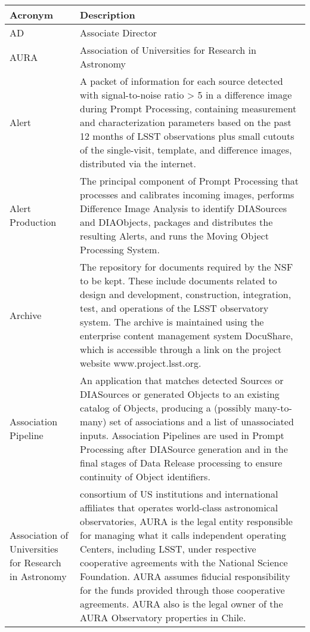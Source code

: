 \addtocounter{table}{-1}
\begin{longtable}{|l|p{}|}\hline
\textbf{Acronym} & \textbf{Description}  \\\hline

AD & Associate \gls{Director} \\\hline
AURA & \gls{Association of Universities for Research in Astronomy} \\\hline
Alert & A packet of information for each source detected with signal-to-noise ratio > 5 in a difference image during \gls{Prompt Processing}, containing measurement and characterization parameters based on the past 12 months of \gls{LSST} observations plus small cutouts of the single-visit, template, and difference images, distributed via the internet. \\\hline
Alert Production & The principal component of \gls{Prompt Processing} that processes and calibrates incoming images, performs \gls{Difference Image Analysis} to identify DIASources and DIAObjects, packages and distributes the resulting Alerts, and runs the \gls{Moving Object Processing System}. \\\hline
Archive & The repository for documents required by the \gls{NSF} to be kept. These include documents related to design and development, construction, integration, test, and operations of the \gls{LSST} observatory system. The archive is maintained using the enterprise content management system \gls{DocuShare}, which is accessible through a link on the project website www.project.lsst.org. \\\hline
Association Pipeline & An application that matches detected Sources or DIASources or generated Objects to an existing catalog of Objects, producing a (possibly many-to-many) set of associations and a list of unassociated inputs. Association Pipelines are used in \gls{Prompt Processing} after \gls{DIASource} generation and in the final stages of \gls{Data Release} processing to ensure continuity of \gls{Object} identifiers. \\\hline
Association of Universities for Research in Astronomy &  consortium of \gls{US} institutions and international affiliates that operates world-class astronomical observatories, \gls{AURA} is the legal entity responsible for managing what it calls independent operating Centers, including \gls{LSST}, under respective cooperative agreements with the \gls{National Science Foundation}. \gls{AURA} assumes fiducial responsibility for the funds provided through those cooperative agreements. \gls{AURA} also is the legal owner of the \gls{AURA} Observatory properties in Chile. \\\hline

\end{longtable}
